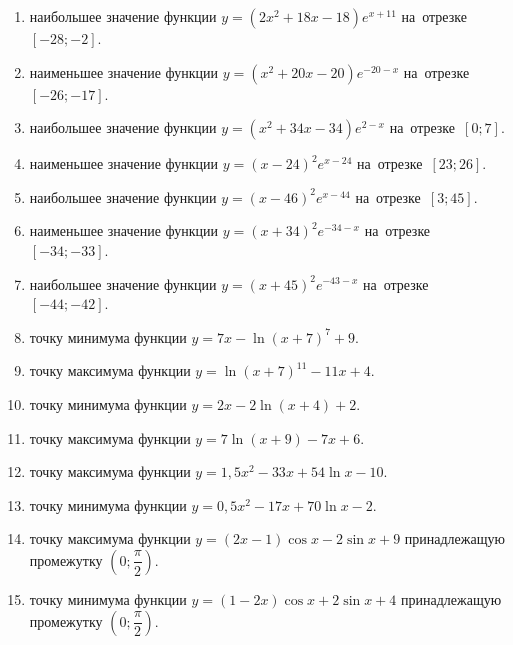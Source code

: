 \documentclass[a4paper,10pt]{article}
\begin{document}
\begin{enumerate}
\item {} наибольшее значение функции $y=\left(2x^2 +18x -18\right)e^{x+11}$ на~отрезке~$\left[-28;-2\right]$.

\item {} наименьшее значение функции $y=\left(x^2 +20x -20\right)e^{-20-x}$ на~отрезке~$\left[-26;-17\right]$.

\item {} наибольшее значение функции $y=\left(x^2 +34x -34\right)e^{2-x}$ на~отрезке~$\left[0;7\right]$.

\item {} наименьшее значение функции $y=\left(x-24\right)^2e^{x-24}$ на~отрезке~$\left[23;26\right]$.

\item {} наибольшее значение функции $y=\left(x-46\right)^2e^{x-44}$ на~отрезке~$\left[3;45\right]$.

\item {} наименьшее значение функции $y=\left(x+34\right)^2e^{-34-x}$ на~отрезке~$\left[-34;-33\right]$.

\item {} наибольшее значение функции $y=\left(x+45\right)^2e^{-43-x}$ на~отрезке~$\left[-44;-42\right]$.

\item {} точку минимума функции $y=7x-\ln\left(x+7\right)^{7}+9$.

\item {} точку максимума функции $y=\ln\left(x+7\right)^{11}-11x+4$.

\item {} точку минимума функции $y=2x-2\ln\left(x+4\right)+2$.

\item {} точку максимума функции $y=7\ln\left(x+9\right)-7x+6$.

\item {} точку максимума функции $y=1,5x^2-33x+54\ln x -10$.

\item {} точку минимума функции $y=0,5x^2-17x+70\ln x -2$.

\item {} точку максимума функции $y=\left(2x-1\right)\cos x -2\sin x+9$
принадлежащую промежутку $\left(0;\dfrac{\pi}{2}\right)$.

\item {} точку минимума функции $y=\left(1-2x\right)\cos x +2\sin x+4$
принадлежащую промежутку $\left(0;\dfrac{\pi}{2}\right)$.


\end{enumerate}
\end{document}
